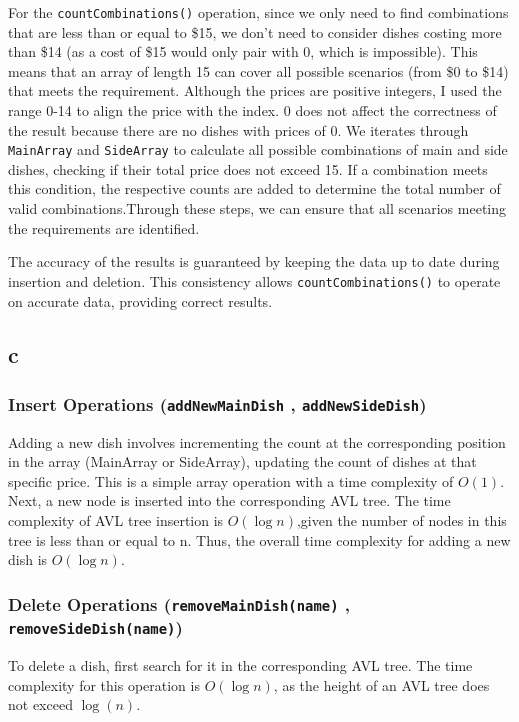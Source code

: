 \documentclass[12pt]{article}
\begin{document}
        For the \texttt{countCombinations()} operation, since we only need to find combinations that are less than or equal to \$15, we don't need to consider dishes costing more than \$14 (as a cost of \$15 would only pair with 0, which is impossible). This means that an array of length 15 can cover all possible scenarios (from \$0 to \$14) that meets the requirement. Although the prices are positive integers, I used the range 0-14 to align the price with the index. 0 does not affect the correctness of the result because there are no dishes with prices of 0. We iterates through \texttt{MainArray} and \texttt{SideArray} to calculate all possible combinations of main and side dishes, checking if their total price does not exceed 15. If a combination meets this condition, the respective counts are added to determine the total number of valid combinations.Through these steps, we can ensure that all scenarios meeting the requirements are identified.

        The accuracy of the results is guaranteed by keeping the data up to date during insertion and deletion. This consistency allows \texttt{countCombinations()} to operate on accurate data, providing correct results.

    \subsection*{c}

        \subsubsection*{Insert Operations (\texttt{addNewMainDish} , \texttt{addNewSideDish})} 
        Adding a new dish involves incrementing the count at the corresponding position in the array (MainArray or SideArray), updating the count of dishes at that specific price. This is a simple array operation with a time complexity of \(O(1)\). Next, a new node is inserted into the corresponding AVL tree. The time complexity of AVL tree insertion is \(O(\log n)\),given the number of nodes in this tree is less than or equal to n. Thus, the overall time complexity for adding a new dish is \(O(\log n)\).

        \subsubsection*{Delete Operations (\texttt{removeMainDish(name)} , \texttt{removeSideDish(name)})}
        To delete a dish, first search for it in the corresponding AVL tree. The time complexity for this operation is \(O(\log n)\), as the height of an AVL tree does not exceed \(\log(n)\).
\end{document}
